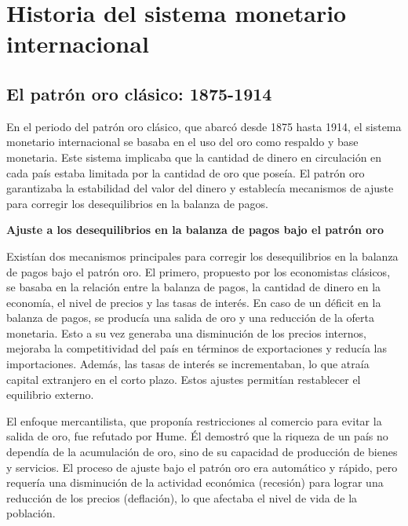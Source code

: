 \documentclass[
  letterpaper,
  DIV=11,
  numbers=noendperiod]{scrartcl}
\begin{document}
\hypertarget{historia-del-sistema-monetario-internacional}{%
\section{Historia del sistema monetario
internacional}\label{historia-del-sistema-monetario-internacional}}

\hypertarget{el-patruxf3n-oro-cluxe1sico-1875-1914}{%
\subsection{El patrón oro clásico:
1875-1914}\label{el-patruxf3n-oro-cluxe1sico-1875-1914}}

En el periodo del patrón oro clásico, que abarcó desde 1875 hasta 1914,
el sistema monetario internacional se basaba en el uso del oro como
respaldo y base monetaria. Este sistema implicaba que la cantidad de
dinero en circulación en cada país estaba limitada por la cantidad de
oro que poseía. El patrón oro garantizaba la estabilidad del valor del
dinero y establecía mecanismos de ajuste para corregir los
desequilibrios en la balanza de pagos.

\textbf{Ajuste a los desequilibrios en la balanza de pagos bajo el
patrón oro}

Existían dos mecanismos principales para corregir los desequilibrios en
la balanza de pagos bajo el patrón oro. El primero, propuesto por los
economistas clásicos, se basaba en la relación entre la balanza de
pagos, la cantidad de dinero en la economía, el nivel de precios y las
tasas de interés. En caso de un déficit en la balanza de pagos, se
producía una salida de oro y una reducción de la oferta monetaria. Esto
a su vez generaba una disminución de los precios internos, mejoraba la
competitividad del país en términos de exportaciones y reducía las
importaciones. Además, las tasas de interés se incrementaban, lo que
atraía capital extranjero en el corto plazo. Estos ajustes permitían
restablecer el equilibrio externo.

El enfoque mercantilista, que proponía restricciones al comercio para
evitar la salida de oro, fue refutado por Hume. Él demostró que la
riqueza de un país no dependía de la acumulación de oro, sino de su
capacidad de producción de bienes y servicios. El proceso de ajuste bajo
el patrón oro era automático y rápido, pero requería una disminución de
la actividad económica (recesión) para lograr una reducción de los
precios (deflación), lo que afectaba el nivel de vida de la población.
\end{document}
